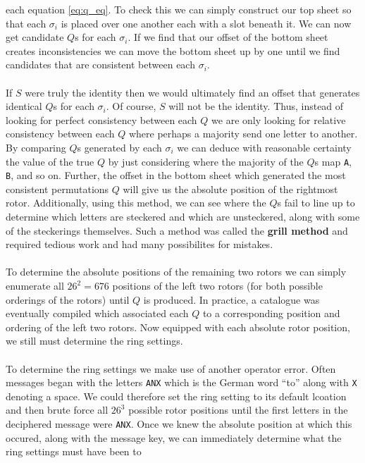 each equation \ref{eq:q_eq}. To check this we can simply construct
our top sheet so that each $\sigma_i$ is placed over one another each
with a slot beneath it. We can now get candidate $Q$s for each
$\sigma_i$. If we find that our offset of the bottom sheet creates
inconsistencies we can move the bottom sheet up by one until we find
candidates that are consistent between each $\sigma_i$.
\\\\If $S$ were truly the identity then we would ultimately find an
offset that generates identical $Q$s for each $\sigma_i$. Of course,
$S$ will not be the identity. Thus, instead of looking for perfect
consistency between each $Q$ we are only looking for relative
consistency between each $Q$ where perhaps a majority send one letter
to another. By comparing $Q$s generated by each $\sigma_i$ we can
deduce with reasonable certainty the value of the true $Q$ by just
considering where the majority of the $Q$s map \texttt{A},
\texttt{B}, and so on. Further, the offset in the bottom sheet which
generated the most consistent permutations $Q$ will give us the
absolute position of the rightmost rotor. Additionally, using this
method, we can see where the $Q$s fail to line up to determine which
letters are steckered and which are unsteckered, along with some of
the steckerings themselves. Such a method was called the {\bf{grill
method}} and required tedious work and had many possibilites for mistakes.
\\\\To determine the absolute positions of the remaining two rotors
we can simply enumerate all $26^2 = 676$ positions of the left two
rotors (for both possible orderings of the rotors) until $Q$ is
produced. In practice, a catalogue was eventually compiled which
associated each $Q$ to a corresponding position and ordering of the
left two rotors. Now equipped with each absolute rotor position, we
still must determine the ring settings.
\\\\To determine the ring settings we make use of another operator
error. Often messages began with the letters \texttt{ANX} which is
the German word ``to'' along with \texttt{X} denoting a space. We
could therefore set the ring setting to its default lcoation and then
brute force all $26^3$ possible rotor positions until the first
letters in the deciphered message were \texttt{ANX}. Once we knew the
absolute position at which this occured, along with the message key,
we can immediately determine what the ring settings must have been to
